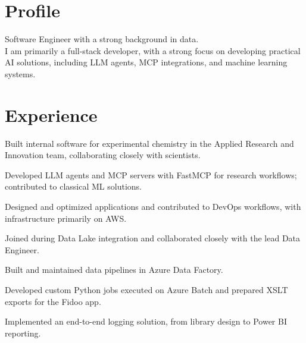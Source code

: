 \documentclass[]{plushcv}
\begin{document}
%
%


%
%

\begin{minipage}[t]{0.70\textwidth}
\renewcommand{\sectionsep}{\vspace{2pt}}


\section{Profile}
Software Engineer with a strong background in data. \\
I am primarily a full-stack developer, with a strong focus on developing practical AI solutions, including LLM agents, MCP integrations, and machine learning systems.
\sectionsep


\section{Experience}

\vspace{\topsep}
\begin{tightemize}
\sectionsep
\item Built internal software for experimental chemistry in the Applied Research and Innovation team, collaborating closely with scientists.
\item Developed LLM agents and MCP servers with FastMCP for research workflows; contributed to classical ML solutions.
\item Designed and optimized applications and contributed to DevOps workflows, with infrastructure primarily on AWS.
\end{tightemize}
\sectionsep


\vspace{\topsep}
\begin{tightemize}
\sectionsep
\item Joined during Data Lake integration and collaborated closely with the lead Data Engineer.
\item Built and maintained data pipelines in Azure Data Factory.
\item Developed custom Python jobs executed on Azure Batch and prepared XSLT exports for the Fidoo app.
\item Implemented an end-to-end logging solution, from library design to Power BI reporting.
\end{tightemize}
\sectionsep


\end{minipage}
\end{document}
